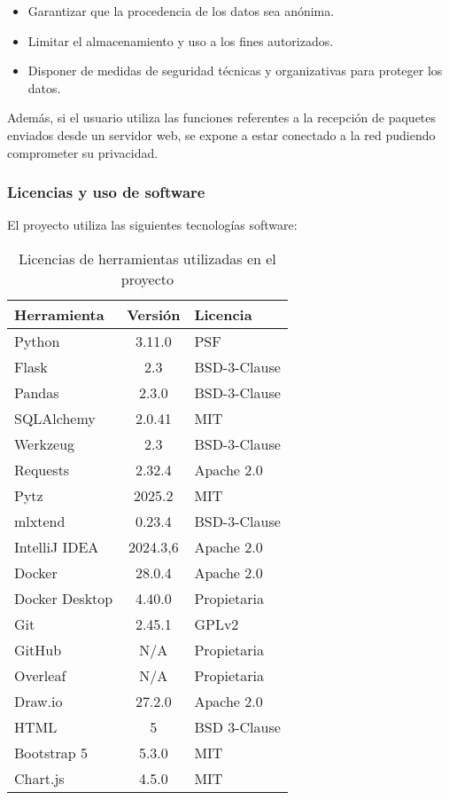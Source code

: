 \begin{itemize}
    \item Garantizar que la procedencia de los datos sea anónima.
     \item Limitar el almacenamiento y uso a los fines autorizados.
     \item Disponer de medidas de seguridad técnicas y organizativas para proteger los datos.
\end{itemize}


Además, si el usuario utiliza las funciones referentes a la recepción de paquetes enviados desde un servidor web, se expone a estar conectado a la red pudiendo comprometer su privacidad.



\subsubsection{Licencias y uso de software}

El proyecto utiliza las siguientes tecnologías software:

\begin{table}[H]
\centering
\begin{tabular}{|l|c|l|}
\hline
\textbf{Herramienta} & \textbf{Versión} & \textbf{Licencia} \\
\hline
Python & 3.11.0 & PSF \\
Flask & 2.3 & BSD-3-Clause \\
Pandas & 2.3.0 & BSD-3-Clause \\
SQLAlchemy & 2.0.41 & MIT \\
Werkzeug & 2.3 & BSD-3-Clause \\
Requests & 2.32.4 & Apache 2.0 \\
Pytz & 2025.2 & MIT \\
mlxtend & 0.23.4 & BSD-3-Clause \\
IntelliJ IDEA & 2024.3,6 & Apache 2.0 \\
Docker & 28.0.4 & Apache 2.0 \\
Docker Desktop & 4.40.0 & Propietaria \\
Git & 2.45.1 & GPLv2 \\
GitHub & N/A & Propietaria \\
Overleaf & N/A & Propietaria \\
Draw.io & 27.2.0 & Apache 2.0 \\
HTML & 5 & BSD 3-Clause \\
Bootstrap 5 & 5.3.0 & MIT \\
Chart.js & 4.5.0 & MIT \\
\hline
\end{tabular}
\caption{Licencias de herramientas utilizadas en el proyecto}
\end{table}


